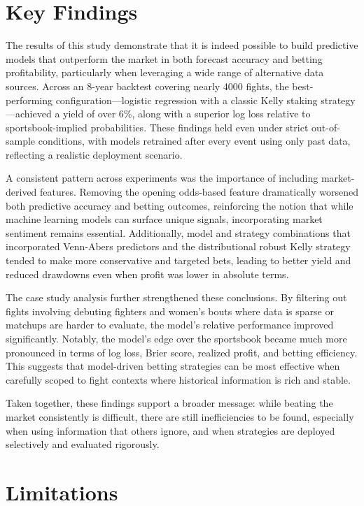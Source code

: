 \documentclass[12pt,twoside]{report}
\begin{document}
\section{Key Findings}

The results of this study demonstrate that it is indeed possible to build predictive models that outperform the market in both forecast accuracy and betting profitability, particularly when leveraging a wide range of alternative data sources. Across an 8-year backtest covering nearly 4000 fights, the best-performing configuration---logistic regression with a classic Kelly staking strategy---achieved a yield of over 6\%, along with a superior log loss relative to sportsbook-implied probabilities. These findings held even under strict out-of-sample conditions, with models retrained after every event using only past data, reflecting a realistic deployment scenario.

A consistent pattern across experiments was the importance of including market-derived features. Removing the opening odds-based feature dramatically worsened both predictive accuracy and betting outcomes, reinforcing the notion that while machine learning models can surface unique signals, incorporating market sentiment remains essential. Additionally, model and strategy combinations that incorporated Venn-Abers predictors and the distributional robust Kelly strategy tended to make more conservative and targeted bets, leading to better yield and reduced drawdowns even when profit was lower in absolute terms.

The case study analysis further strengthened these conclusions. By filtering out fights involving debuting fighters and women's bouts where data is sparse or matchups are harder to evaluate, the model's relative performance improved significantly. Notably, the model’s edge over the sportsbook became much more pronounced in terms of log loss, Brier score, realized profit, and betting efficiency. This suggests that model-driven betting strategies can be most effective when carefully scoped to fight contexts where historical information is rich and stable.

Taken together, these findings support a broader message: while beating the market consistently is difficult, there are still inefficiencies to be found, especially when using information that others ignore, and when strategies are deployed selectively and evaluated rigorously.

\section{Limitations}
\end{document}
